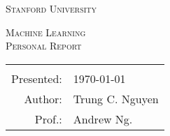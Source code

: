 \begin{titlepage}
\setcounter{page}{-1}
\begin{center}
\textsc{Stanford University}\\[6ex]

\vfill
\vfill

\textsc{\Huge Machine Learning}\\[6ex]
\textsc{ Personal Report}\\[6ex]

\vspace{20pt}

\vfill
\vfill

 \begin{tabular}{rl}\hline\\
 Presented:                & \quad \today \\[1.5ex]
 Author:                   & \quad Trung C. Nguyen \\[1.5ex]
 Prof.:     & \quad Andrew Ng.\\[1.5ex]
 \end{tabular}
\end{center}

    \clearpage
    \pagestyle{empty}

\end{titlepage}
